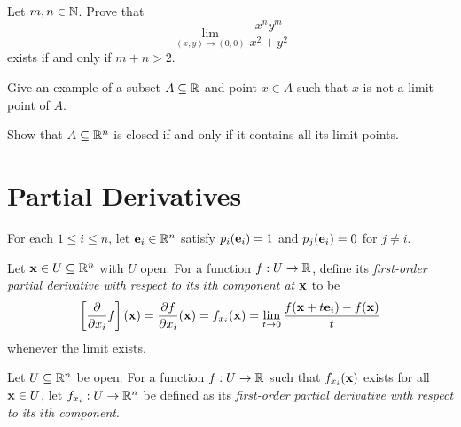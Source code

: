 \documentclass[letterpaper, twoside, 12pt]{book}
\begin{document}
\begin{exercise}[4]
  Let \(m,n\in\mathbb N\). Prove that
  \[
    \lim_{(x,y)\to(0,0)}\frac{x^ny^m}{x^2+y^2}
  \]
  exists if and only if \(m+n>2\).
\end{exercise}
\begin{solution}

\end{solution}

\begin{exercise}[5]
  Give an example of a subset \(A\subseteq\mathbb R\) and point \(x\in A\)
  such that \(x\) is not a limit point of \(A\).
\end{exercise}
\begin{solution}

\end{solution}

\begin{exercise}[12]
  Show that \(A\subseteq\mathbb R^n\) is closed if and only if it contains
  all its limit points.
\end{exercise}
\begin{solution}

\end{solution}


\section{Partial Derivatives}

\begin{definition}
  For each \(1\leq i\leq n\), let \(\mathbf e_i\in\mathbb R^n\)
  satisfy \(p_i(\mathbf e_i)=1\) and \(p_j(\mathbf e_i)=0\) for \(j\not=i\).
\end{definition}

\begin{definition}
  Let \(\mathbf x\in U\subseteq\mathbb R^n\) with \(U\) open. For a function
  \(f:U\to\mathbb R\), define its \textit{first-order
  partial derivative with respect to
  its \(i\)th component at \(\mathbf x\)} to be
  \[
    \left[\frac{\partial}{\partial x_i}f\right](\mathbf x)
      =
    \frac{\partial f}{\partial x_i}(\mathbf x)
      =
    f_{x_i}(\mathbf x)
      =
    \lim_{t\to 0}\frac{f(\mathbf x+t\mathbf e_i)-f(\mathbf x)}{t}
  \]
  whenever the limit exists.
\end{definition}

\begin{definition}
  Let \(U\subseteq\mathbb R^n\) be open. For a function
  \(f:U\to\mathbb R\) such that \(f_{x_i}(\mathbf x)\) exists for all \(\mathbf x\in U\),
  let \(f_{x_i}:U\to\mathbb R^n\) be defined as its
  \textit{first-order partial derivative with respect to
  its \(i\)th component}.
\end{definition}
\end{document}
